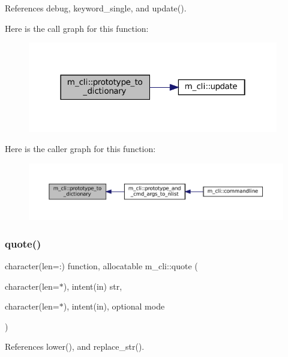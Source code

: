 References debug, keyword\+\_\+single, and update().

Here is the call graph for this function\+:\nopagebreak
\begin{figure}[H]
\begin{center}
\leavevmode
\includegraphics[width=310pt]{namespacem__cli_a8c62537a2d224364c9cb30005be819e9_cgraph}
\end{center}
\end{figure}
Here is the caller graph for this function\+:\nopagebreak
\begin{figure}[H]
\begin{center}
\leavevmode
\includegraphics[width=350pt]{namespacem__cli_a8c62537a2d224364c9cb30005be819e9_icgraph}
\end{center}
\end{figure}
\mbox{\label{namespacem__cli_ac82fec2a5441020701fe3c64af3d9948}} 
\subsubsection{\texorpdfstring{quote()}{quote()}}
{\footnotesize\ttfamily character(len=\+:) function, allocatable m\+\_\+cli\+::quote (\begin{DoxyParamCaption}\item[{character(len=$\ast$), intent(in)}]{str,  }\item[{character(len=$\ast$), intent(in), optional}]{mode }\end{DoxyParamCaption})\hspace{0.3cm}{\ttfamily [private]}}



References lower(), and replace\+\_\+str().

